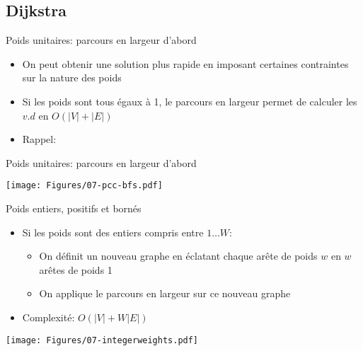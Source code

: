 \subsection{Dijkstra}

\begin{frame}{Poids unitaires: parcours en largeur d'abord}

\begin{itemize}
\item On peut obtenir une solution plus rapide en imposant certaines
  contraintes sur la nature des poids
\item Si les poids sont tous égaux à 1, le parcours en largeur permet
  de calculer les $v.d$ en $O(|V|+|E|)$
\item Rappel:
\end{itemize}

\begin{center}
{\small
{}
}
\end{center}

\end{frame}

\begin{frame}{Poids unitaires: parcours en largeur d'abord}

\centerline{\texttt{[image: Figures/07-pcc-bfs.pdf]}}

\end{frame}

\begin{frame}{Poids entiers, positifs et bornés}

\begin{itemize}
\item Si les poids sont des entiers compris entre $1\ldots W$:
\begin{itemize}
\item On définit un nouveau graphe en éclatant chaque arête de poids $w$ en $w$ arêtes de poids 1
\item On applique le parcours en largeur sur ce nouveau graphe
\end{itemize}
\item Complexité: $O(|V|+W |E|)$
\end{itemize}

\centerline{\texttt{[image: Figures/07-integerweights.pdf]}}

\end{frame}


